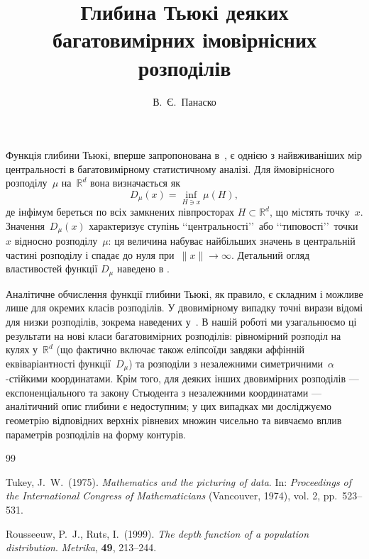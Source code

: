 \documentclass[10pt,reqno]{amsart}
\theoremstyle{plain}
\theoremstyle{definition}
\theoremstyle{remark}
\begin{document}
\title{Глибина Тьюкі деяких багатовимірних імовірнісних розподілів} 

\author{В.~Є.~Панаско}
\address{КПІ ім. Ігоря Сікорського, Київ, Україна}

\makeatletter\def\and{\unskip,\;\space\ignorespaces}\def\author@andify{\nxandlist{\and}{\and}{\and}}\makeatother

\maketitle\pagestyle{empty}\thispagestyle{empty}

Функція глибини Тьюкі, вперше запропонована в~\cite{tukey1975}, є однією з найвживаніших мір центральності в багатовимірному статистичному аналізі. Для ймовірнісного розподілу~$\mu$ на~$\mathbb{R}^d$ вона визначається як
\[
D_{\mu}(x) = \inf_{H \ni x} \mu(H),
\]
де інфімум береться по всіх замкнених півпросторах $H \subset \mathbb{R}^d$, що містять точку~$x$. Значення~$D_{\mu}(x)$ характеризує ступінь \lq\lq центральності\rq\rq\ або \lq\lq типовості\rq\rq\ точки $x$ відносно розподілу~$\mu$: ця величина набуває найбільших значень в центральній частині розподілу і спадає до нуля при~$\|x\| \to \infty$. Детальний огляд властивостей функції $D_{\mu}$ наведено в \cite{rousseeuw1999}.

Аналітичне обчислення функції глибини Тьюкі, як правило, є складним і можливе лише для окремих класів розподілів. У двовимірному випадку точні вирази відомі для низки розподілів, зокрема наведених у~\cite{rousseeuw1999}. В нашій роботі ми узагальнюємо ці результати на нові класи багатовимірних розподілів: рівномірний розподіл на кулях у~$\mathbb{R}^d$ (що фактично включає також еліпсоїди завдяки аффінній еквіваріантності функції~$D_{\mu}$) та розподіли з незалежними симетричними~$\alpha$-стійкими координатами. Крім того, для деяких інших двовимірних розподілів --- експоненціального та закону Стьюдента з незалежними координатами --- аналітичний опис глибини є недоступним; у цих випадках ми досліджуємо геометрію відповідних верхніх рівневих множин чисельно та вивчаємо вплив параметрів розподілів на форму контурів.

\begin{thebibliography}{99}
	
	Tukey, J.\ W.\ (1975).
	\textit{Mathematics and the picturing of data}.
	In: \textit{Proceedings of the International Congress of Mathematicians} (Vancouver, 1974), vol. 2, pp.~523--531.
	
	Rousseeuw, P.\ J., Ruts, I.\ (1999).
	\textit{The depth function of a population distribution}.
	\textit{Metrika}, \textbf{49}, 213--244.
	
\end{thebibliography}
\end{document}
